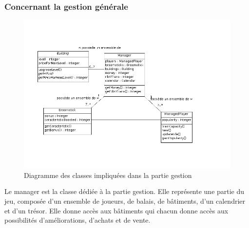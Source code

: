 \documentclass[a4paper,titlepage]{scrreprt}
\begin{document}
  \subsubsection{Concernant la gestion générale}
    \begin{figure}[H]
    \center
    \includegraphics[scale=0.5]{uml/class/DiagrammedeclassesManagement.png}
    \caption{Diagramme des classes impliquées dans la partie gestion}
    \end{figure}	
    Le manager est la classe dédiée à la partie gestion. Elle représente une partie du jeu,
    composée d'un ensemble de joueurs, de balais, de bâtiments, d'un calendrier et d'un trésor.
    Elle donne accès aux bâtiments qui chacun donne accès aux possibilités d'améliorations, d'achats et de vente.
\end{document}
